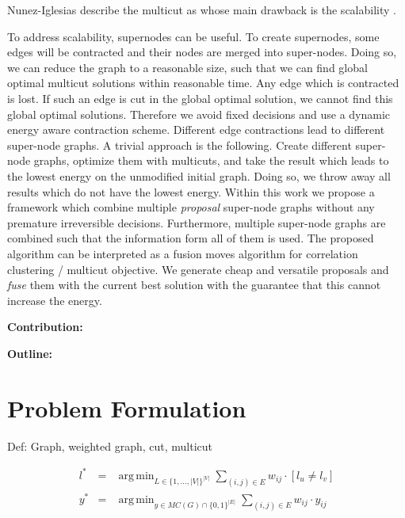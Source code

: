 \documentclass[10pt,twocolumn,letterpaper]{article}
\DeclareMathOperator*{\argmin}{arg\,min}
\begin{document}


Nunez-Iglesias \etal describe the multicut as
 whose 
main drawback is the scalability \cite{nunez_iglesias_2013}.


To address scalability, supernodes can be useful.
To create supernodes, some edges will be contracted
and their nodes are merged into super-nodes.
Doing so, we can reduce  the graph 
to a reasonable size, such that we can find
global optimal multicut solutions within reasonable time.
%
Any edge which is contracted is lost.
If such an edge is cut in the global optimal solution, we cannot 
find this global optimal solutions.
Therefore we avoid fixed decisions and use a
dynamic energy aware contraction scheme.
%
Different edge contractions lead to different super-node graphs.
A trivial approach is the following.
Create different super-node graphs, optimize them with multicuts,
and take the result which leads to the lowest energy
on the unmodified initial graph.
% 
Doing so, we throw away all results which do not have the lowest energy.
Within this work we propose a framework which 
combine multiple \emph{proposal} super-node graphs
without any premature irreversible decisions.
Furthermore, multiple super-node graphs are combined such
that the information form all of them is used.
%
The proposed algorithm can be interpreted as a fusion moves
algorithm for correlation clustering / multicut objective.
We generate cheap and versatile proposals
and \emph{fuse} them with the current best solution with the
guarantee that this cannot increase the energy.


\textbf{Contribution:}

\textbf{Outline:}


\section{Problem Formulation}
Def: Graph, weighted graph, cut, multicut 


\begin{center}
    \begin{eqnarray}
        l^* &=& \argmin_{L \in \{1,\ldots,|V|\}^{|V|}} \sum_{ (i,j) \in E } w_{ij} \cdot [l_{u} \neq l_{v}] \label{eq:nodeproblem}\\
        y^* &=& \argmin_{y \in MC(G)\cap \{0,1\}^{|E|}} \sum_{ (i,j) \in E } w_{ij} \cdot y_{ij} \label{eq:edgeproblem}%
    \end{eqnarray}
\end{center}
\end{document}
